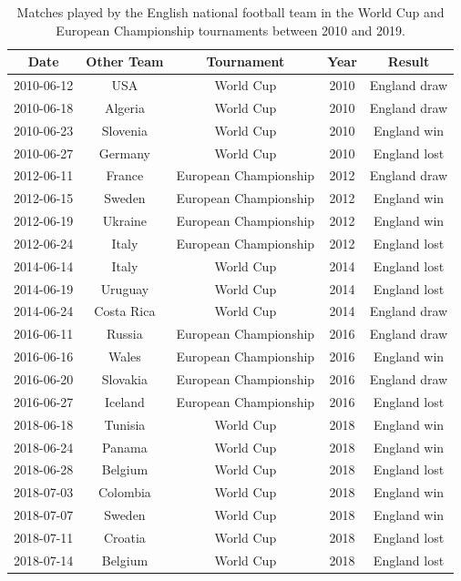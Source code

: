 \documentclass[12pt, a4paper]{article}
\begin{document}
 
 
\begin{table}[!htbp]
\centering
    \caption{Matches played by the English national football team in the World Cup and European Championship tournaments between 2010 and 2019.}
\begin{tabular}{ccccc}
  \hline
\textbf{Date} & \textbf{Other Team} & \textbf{Tournament} & \textbf{Year} & \textbf{Result} \\ 
  \hline
2010-06-12 & USA & World Cup & 2010 & England draw \\ 
  2010-06-18 & Algeria & World Cup & 2010 & England draw \\ 
  2010-06-23 & Slovenia & World Cup & 2010 & England win \\ 
  2010-06-27 & Germany & World Cup & 2010 & England lost \\ 
  2012-06-11 & France & European Championship & 2012 & England draw \\ 
  2012-06-15 & Sweden & European Championship & 2012 & England win \\ 
  2012-06-19 & Ukraine & European Championship & 2012 & England win \\ 
  2012-06-24 & Italy & European Championship & 2012 & England lost \\ 
  2014-06-14 & Italy & World Cup & 2014 & England lost \\ 
  2014-06-19 & Uruguay & World Cup & 2014 & England lost \\ 
  2014-06-24 & Costa Rica & World Cup & 2014 & England draw \\ 
  2016-06-11 & Russia & European Championship & 2016 & England draw \\ 
  2016-06-16 & Wales & European Championship & 2016 & England win \\ 
  2016-06-20 & Slovakia & European Championship & 2016 & England draw \\ 
  2016-06-27 & Iceland & European Championship & 2016 & England lost \\ 
  2018-06-18 & Tunisia & World Cup & 2018 & England win \\ 
  2018-06-24 & Panama & World Cup & 2018 & England win \\ 
  2018-06-28 & Belgium & World Cup & 2018 & England lost \\ 
  2018-07-03 & Colombia & World Cup & 2018 & England win \\ 
  2018-07-07 & Sweden & World Cup & 2018 & England win \\ 
  2018-07-11 & Croatia & World Cup & 2018 & England lost \\ 
  2018-07-14 & Belgium & World Cup & 2018 & England lost \\ 
   \hline
\end{tabular}
  \label{Tab:matches}
\end{table}
\end{document}
